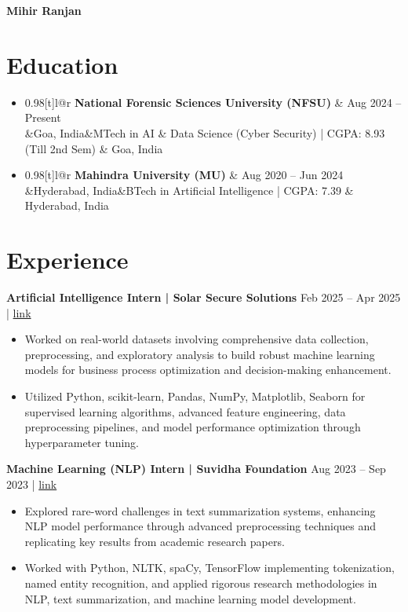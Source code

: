 \documentclass[a4paper,11pt]{article}
\makeatletter
\newcommand{\resumeSubheading}[4]{\vspace{0.5mm}\item
  \begin{tabular*}{0.98\textwidth}[t]{l@{\extracolsep{\fill}}r}
    \textbf{#1} & #4 \\
    \ifx&#2&\else #3 & #2 \\ \fi
  \end{tabular*}
  \vspace{-2mm}
}
\newcommand{\resumeSubHeadingListStart}{\begin{itemize}[leftmargin=*,labelsep=1mm,itemsep=0pt]}
\newcommand{\resumeItemListStart}{\begin{itemize}[leftmargin=*,labelsep=1mm,itemsep=0pt,topsep=2pt]}
\newcommand{\resumeSubHeadingListEnd}{\end{itemize}\vspace{1mm}}
\newcommand{\resumeItemListEnd}{\end{itemize}\vspace{1mm}}
\makeatother
\begin{document}
\begin{center}
    {\Huge\textbf{Mihir Ranjan}}
\end{center}

\begin{center}
\normalsize
{}
\end{center}

\section{\textbf{Education}}
\resumeSubHeadingListStart
\resumeSubheading
{National Forensic Sciences University (NFSU)}{Goa, India}
{MTech in AI \& Data Science (Cyber Security) | CGPA: 8.93 (Till 2nd Sem)}{Aug 2024 -- Present}
\resumeSubheading
{Mahindra University (MU)}{Hyderabad, India}
{BTech in Artificial Intelligence | CGPA: 7.39}{Aug 2020 -- Jun 2024}
\resumeSubHeadingListEnd

\section{\textbf{Experience}}
\textbf{Artificial Intelligence Intern | Solar Secure Solutions} \hfill Feb 2025 -- Apr 2025 | \href{https://drive.google.com/file/d/1v5wkboBHZhA96TD6UUG0w7nRD0ga55KI/view?usp=sharing}{link}
\resumeItemListStart
\item Worked on real-world datasets involving comprehensive data collection, preprocessing, and exploratory analysis to build robust machine learning models for business process optimization and decision-making enhancement.
\item Utilized Python, scikit-learn, Pandas, NumPy, Matplotlib, Seaborn for supervised learning algorithms, advanced feature engineering, data preprocessing pipelines, and model performance optimization through hyperparameter tuning.
\resumeItemListEnd

\textbf{Machine Learning (NLP) Intern | Suvidha Foundation} \hfill Aug 2023 -- Sep 2023 | \href{https://drive.google.com/drive/folders/19H8OfldP-IzY1z7j5lbYPetJRdtEx4qy?usp=sharing}{link}
\resumeItemListStart
\item Explored rare-word challenges in text summarization systems, enhancing NLP model performance through advanced preprocessing techniques and replicating key results from academic research papers.
\item Worked with Python, NLTK, spaCy, TensorFlow implementing tokenization, named entity recognition, and applied rigorous research methodologies in NLP, text summarization, and machine learning model development.
\resumeItemListEnd
\end{document}
